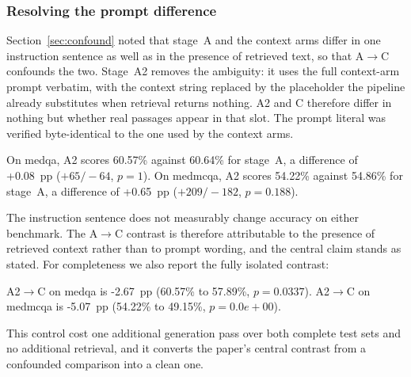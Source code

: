 \subsubsection{Resolving the prompt difference}
\label{sec:confound-resolved}

Section~\ref{sec:confound} noted that stage~A and the context arms differ in one instruction sentence as well as in the presence of retrieved text, so that A$\rightarrow$C confounds the two. Stage~A2 removes the ambiguity: it uses the full context-arm prompt verbatim, with the context string replaced by the placeholder the pipeline already substitutes when retrieval returns nothing. A2 and C therefore differ in nothing but whether real passages appear in that slot. The prompt literal was verified byte-identical to the one used by the context arms.

On medqa, A2 scores 60.57\% against 60.64\% for stage~A, a difference of +0.08~pp ($+65/-64$, $p=1$).
On medmcqa, A2 scores 54.22\% against 54.86\% for stage~A, a difference of +0.65~pp ($+209/-182$, $p=0.188$).

The instruction sentence does not measurably change accuracy on either benchmark. The A$\rightarrow$C contrast is therefore attributable to the presence of retrieved context rather than to prompt wording, and the central claim stands as stated. For completeness we also report the fully isolated contrast:

A2$\rightarrow$C on medqa is -2.67~pp (60.57\% to 57.89\%, $p=0.0337$).
A2$\rightarrow$C on medmcqa is -5.07~pp (54.22\% to 49.15\%, $p=0.0e+00$).

This control cost one additional generation pass over both complete test sets and no additional retrieval, and it converts the paper's central contrast from a confounded comparison into a clean one.
